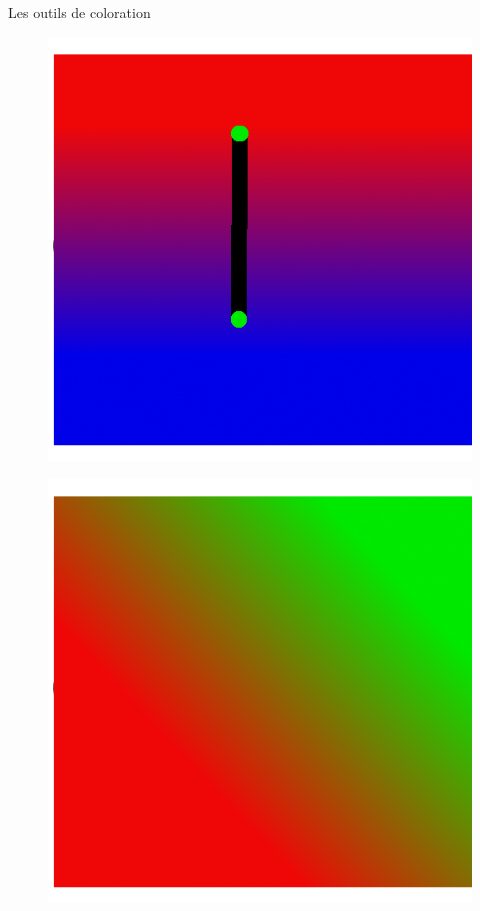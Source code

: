 \documentclass[10pt,svgnames,usenames,table]{beamer}
\begin{document}
\begin{frame}{Les outils de coloration}
\begin{overprint}
\begin{enumerate}
{				\begin{minipage}{0.45\textwidth}
				\begin{figure}
				    	\centering
				    	\includegraphics[width=\textwidth]{Images/degrade_ex.png} 
				\end{figure}
				\end{minipage}\hfill
				\begin{minipage}{0.45\textwidth}
				\begin{figure}
				    	\centering
				    	\includegraphics[width=\textwidth]{Images/degrade_ex2.png} 
				\end{figure}
				\end{minipage}
			
}
\end{enumerate}
\end{overprint}
\end{frame}
\end{document}
